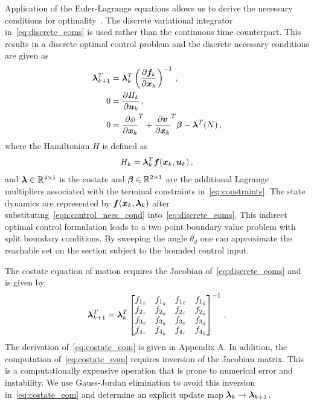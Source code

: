 \documentclass[smallcondensed]{svjour3}
\begin{document}
Application of the Euler-Lagrange equations allows us to derive the necessary conditions for optimality~\cite{bryson1975}.
The discrete variational integrator in~\cref{eq:discrete_eoms} is used rather than the continuous time counterpart. 
This results in a discrete optimal control problem and the discrete necessary conditions are given as
\begin{subequations}\label{eq:necc_cond}
\begin{align}
        \bm{\lambda}_{k+1}^T &= \bm{\lambda}_k^T  \left( \frac{\partial \bm{f}_k}{\partial \bm{x}_k} \right)^{-1} \, , \\
        0 &=  \frac{\partial H_k}{\partial \bm{u}_k} \, , \label{eqn:control_necc_cond}\\
        0 &= \frac{\partial \phi}{\partial \bm{x}_k}^T + \frac{\partial \bm{v}}{\partial \bm{x}_k}^T \bm{\beta}  - \bm{\lambda}^T(N) \, ,  
\end{align}
\end{subequations}
where the Hamiltonian \(H\) is defined as
\begin{equation}
        H_k = \bm{\lambda}_k^T \bm{f}(\bm{x}_k, \bm{u}_k) \, ,
        \label{eq:hamiltonian_opt}
\end{equation}
and \( \bm{\lambda} \in \mathbb{R}^{4 \times 1} \) is the costate and \(\bm{\beta} \in \mathbb{R}^{2 \times 1} \) are the additional Lagrange multipliers associated with the terminal constraints in~\cref{eq:constraints}.
The state dynamics are represented by \( \bm{f}(\bm{x}_k, \bm{\lambda}_k ) \) after substituting~\cref{eqn:control_necc_cond} into~\cref{eq:discrete_eoms}.
This indirect optimal control formulation leads to a two point boundary value problem with split boundary conditions. 
By sweeping the angle \( \theta_d \) one can approximate the reachable set on the \Poincare section subject to the bounded control input. 

The costate equation of motion requires the Jacobian of~\cref{eq:discrete_eoms} and is given by
\begin{align}\label{eq:costate_eom}
        \bm{\lambda}_{k+1}^T = \bm{\lambda}_k^T
        \begin{bmatrix} 
                f_{1_x} & f_{1_y} & f_{1_{\dot{x}}} & f_{1_{\dot{y}}} \\
                f_{2_x} & f_{2_y} & f_{2_{\dot{x}}} & f_{2_{\dot{y}}} \\
                f_{3_x} & f_{3_y} & f_{3_{\dot{x}}} & f_{3_{\dot{y}}} \\
                f_{4_x} & f_{4_y} & f_{4_{\dot{x}}} & f_{4_{\dot{y}}}
        \end{bmatrix} ^ {-1} \, .
\end{align}
The derivation of~\cref{eq:costate_eom} is given in Appendix A.
In addition, the computation of~\cref{eq:costate_eom} requires inversion of the Jacobian matrix.
This is a computationally expensive operation that is prone to numerical error and instability.
We use Gauss-Jordan elimination to avoid this inversion in~\cref{eq:costate_eom} and determine an explicit update map \( \bm{\lambda}_k \to \bm{\lambda}_{k+1} \).
\end{document}
